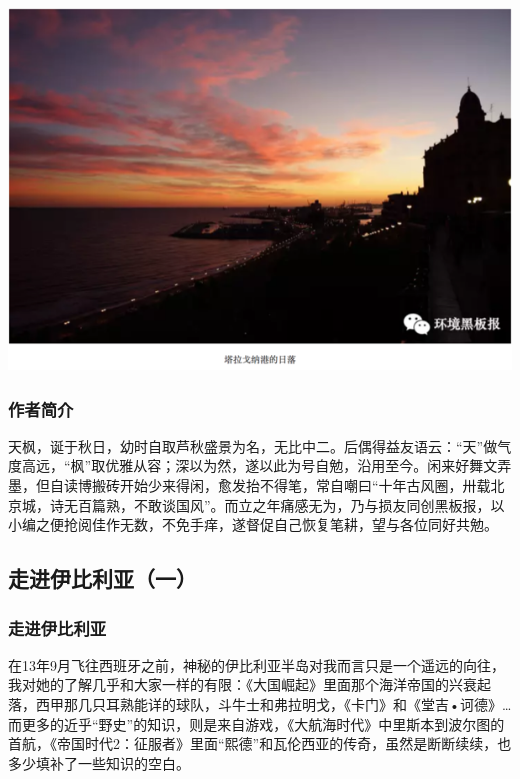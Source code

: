 \documentclass[]{book}
\begin{document}
\includegraphics[width=8.33in]{images/xt7}

\hypertarget{ux4f5cux8005ux7b80ux4ecb-1}{%
\subsubsection{作者简介}\label{ux4f5cux8005ux7b80ux4ecb-1}}

天枫，诞于秋日，幼时自取芦秋盛景为名，无比中二。后偶得益友语云：``天''做气度高远，``枫''取优雅从容；深以为然，遂以此为号自勉，沿用至今。闲来好舞文弄墨，但自读博搬砖开始少来得闲，愈发抬不得笔，常自嘲曰``十年古风圈，卅载北京城，诗无百篇熟，不敢谈国风''。而立之年痛感无为，乃与损友同创黑板报，以小编之便抢阅佳作无数，不免手痒，遂督促自己恢复笔耕，望与各位同好共勉。

\hypertarget{ux8d70ux8fdbux4f0aux6bd4ux5229ux4e9aux4e00}{%
\subsection{走进伊比利亚（一）}\label{ux8d70ux8fdbux4f0aux6bd4ux5229ux4e9aux4e00}}

\hypertarget{ux8d70ux8fdbux4f0aux6bd4ux5229ux4e9a}{%
\subsubsection{走进伊比利亚}\label{ux8d70ux8fdbux4f0aux6bd4ux5229ux4e9a}}

在13年9月飞往西班牙之前，神秘的伊比利亚半岛对我而言只是一个遥远的向往，我对她的了解几乎和大家一样的有限：《大国崛起》里面那个海洋帝国的兴衰起落，西甲那几只耳熟能详的球队，斗牛士和弗拉明戈，《卡门》和《堂吉•诃德》\ldots{}而更多的近乎``野史''的知识，则是来自游戏，《大航海时代》中里斯本到波尔图的首航，《帝国时代2：征服者》里面``熙德''和瓦伦西亚的传奇，虽然是断断续续，也多少填补了一些知识的空白。
\end{document}
